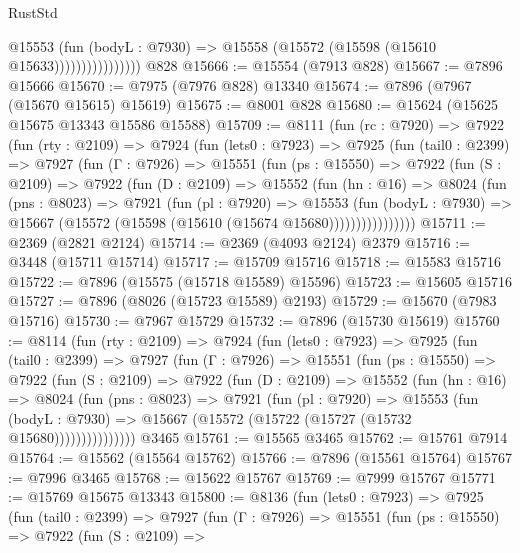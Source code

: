 \begin{lexlean}{RustStd}
\begin{coremodule}
                          @15553
                            (fun (bodyL : @7930) =>
                            @15558 (@15572 (@15598 (@15610 @15633))))))))))))))))
    @828
@15666 := @15554 (@7913 @828)
@15667 := @7896 @15666
@15670 := @7975 (@7976 @828) @13340
@15674 := @7896 (@7967 (@15670 @15615) @15619)
@15675 := @8001 @828
@15680 := @15624 (@15625 @15675 @13343 @15586 @15588)
@15709 := @8111
    (fun (rc : @7920) =>
    @7922
      (fun (rty : @2109) =>
      @7924
        (fun (lets0 : @7923) =>
        @7925
          (fun (tail0 : @2399) =>
          @7927
            (fun (Γ : @7926) =>
            @15551
              (fun (ps : @15550) =>
              @7922
                (fun (S : @2109) =>
                @7922
                  (fun (D : @2109) =>
                  @15552
                    (fun (hn : @16) =>
                    @8024
                      (fun (pns : @8023) =>
                      @7921
                        (fun (pl : @7920) =>
                        @15553
                          (fun (bodyL : @7930) =>
                          @15667 (@15572 (@15598 (@15610 (@15674 @15680))))))))))))))))
@15711 := @2369 (@2821 @2124)
@15714 := @2369 (@4093 @2124) @2379
@15716 := @3448 (@15711 @15714)
@15717 := @15709 @15716
@15718 := @15583 @15716
@15722 := @7896 (@15575 (@15718 @15589) @15596)
@15723 := @15605 @15716
@15727 := @7896 (@8026 (@15723 @15589) @2193)
@15729 := @15670 (@7983 @15716)
@15730 := @7967 @15729
@15732 := @7896 (@15730 @15619)
@15760 := @8114
    (fun (rty : @2109) =>
    @7924
      (fun (lets0 : @7923) =>
      @7925
        (fun (tail0 : @2399) =>
        @7927
          (fun (Γ : @7926) =>
          @15551
            (fun (ps : @15550) =>
            @7922
              (fun (S : @2109) =>
              @7922
                (fun (D : @2109) =>
                @15552
                  (fun (hn : @16) =>
                  @8024
                    (fun (pns : @8023) =>
                    @7921
                      (fun (pl : @7920) =>
                      @15553
                        (fun (bodyL : @7930) =>
                        @15667 (@15572 (@15722 (@15727 (@15732 @15680)))))))))))))))
    @3465
@15761 := @15565 @3465
@15762 := @15761 @7914
@15764 := @15562 (@15564 @15762)
@15766 := @7896 (@15561 @15764)
@15767 := @7996 @3465
@15768 := @15622 @15767
@15769 := @7999 @15767
@15771 := @15769 @15675 @13343
@15800 := @8136
    (fun (lets0 : @7923) =>
    @7925
      (fun (tail0 : @2399) =>
      @7927
        (fun (Γ : @7926) =>
        @15551
          (fun (ps : @15550) =>
          @7922
            (fun (S : @2109) =>

\end{coremodule}
\end{lexlean}

